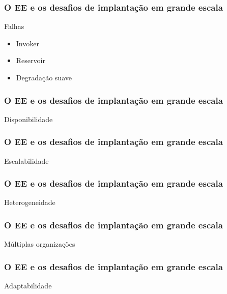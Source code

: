 \documentclass{beamer}
\begin{document}
\begin{frame}
\frametitle{O EE e os desafios de implantação em grande escala}


Falhas

\begin{itemize}
\item Invoker
\item Reservoir
\item Degradação suave
\end{itemize}

\end{frame}



\begin{frame}
\frametitle{O EE e os desafios de implantação em grande escala}

Disponibilidade

\end{frame}



\begin{frame}
\frametitle{O EE e os desafios de implantação em grande escala}

Escalabilidade

\end{frame}



\begin{frame}
\frametitle{O EE e os desafios de implantação em grande escala}

Heterogeneidade

\end{frame}



\begin{frame}
\frametitle{O EE e os desafios de implantação em grande escala}

Múltiplas organizações

\end{frame}



\begin{frame}
\frametitle{O EE e os desafios de implantação em grande escala}

Adaptabilidade

\end{frame}
\end{document}
